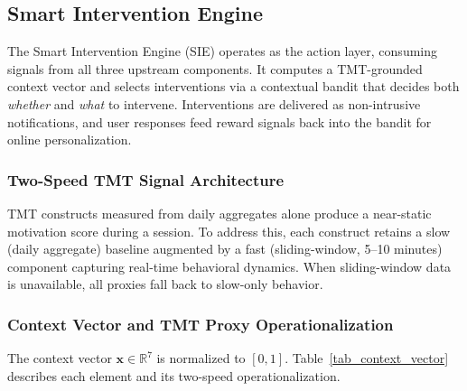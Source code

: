 \documentclass[conference]{IEEEtran}
\begin{document}
\subsection{Smart Intervention Engine}
The Smart Intervention Engine (SIE) operates as the action layer, consuming signals from all three upstream components. It computes a TMT-grounded context vector \cite{b8} and selects interventions via a contextual bandit that decides both \textit{whether} and \textit{what} to intervene. Interventions are delivered as non-intrusive notifications, and user responses feed reward signals back into the bandit for online personalization.

\subsubsection{Two-Speed TMT Signal Architecture}
TMT constructs measured from daily aggregates alone produce a near-static motivation score during a session. To address this, each construct retains a slow (daily aggregate) baseline augmented by a fast (sliding-window, 5--10 minutes) component capturing real-time behavioral dynamics. When sliding-window data is unavailable, all proxies fall back to slow-only behavior.

\subsubsection{Context Vector and TMT Proxy Operationalization}
The context vector $\mathbf{x} \in \mathbb{R}^{7}$ is normalized to $[0, 1]$. Table~\ref{tab_context_vector} describes each element and its two-speed operationalization.
\end{document}
